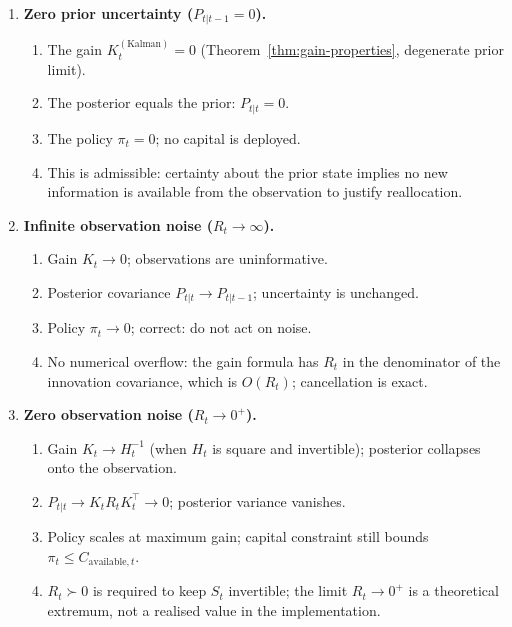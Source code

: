 \documentclass[12pt,openany]{book}
\numberwithin{equation}{chapter}
\theoremstyle{plain}
\theoremstyle{definition}
\theoremstyle{remark}
\begin{document}
\begin{enumerate}

  \item \textbf{Zero prior uncertainty ($P_{t|t-1} = 0$).}
        \begin{enumerate}
          \item The gain $K_t^{(\mathrm{Kalman})} = 0$
                (Theorem~\ref{thm:gain-properties}, degenerate
                prior limit).
          \item The posterior equals the prior: $P_{t|t} = 0$.
          \item The policy $\pi_t = 0$; no capital is deployed.
          \item This is admissible: certainty about the prior
                state implies no new information is available
                from the observation to justify reallocation.
        \end{enumerate}

  \item \textbf{Infinite observation noise ($R_t \to \infty$).}
        \begin{enumerate}
          \item Gain $K_t \to 0$; observations are uninformative.
          \item Posterior covariance $P_{t|t} \to P_{t|t-1}$;
                uncertainty is unchanged.
          \item Policy $\pi_t \to 0$; correct: do not act on
                noise.
          \item No numerical overflow: the gain formula has
                $R_t$ in the denominator of the innovation
                covariance, which is $O(R_t)$; cancellation
                is exact.
        \end{enumerate}

  \item \textbf{Zero observation noise ($R_t \to 0^+$).}
        \begin{enumerate}
          \item Gain $K_t \to H_t^{-1}$ (when $H_t$ is square
                and invertible); posterior collapses onto the
                observation.
          \item $P_{t|t} \to K_t R_t K_t^\top \to 0$; posterior
                variance vanishes.
          \item Policy scales at maximum gain; capital constraint
                still bounds $\pi_t \le C_{\mathrm{available},t}$.
          \item $R_t \succ 0$ is required to keep $S_t$ invertible;
                the limit $R_t \to 0^+$ is a theoretical extremum,
                not a realised value in the implementation.
        \end{enumerate}


\end{enumerate}
\end{document}

